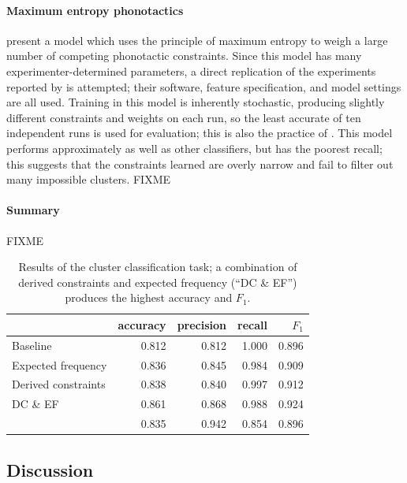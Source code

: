 \paragraph{Maximum entropy phonotactics} \citet{Hayes2008a} present a model which uses the principle of maximum entropy to weigh a large number of competing phonotactic constraints. Since this model has many experimenter-determined parameters, a direct replication of the experiments reported by \citealt{Hayes2008a} is attempted; their software, feature specification, and model settings are all used. Training in this model is inherently stochastic, producing slightly different constraints and weights on each run, so the least accurate of ten independent runs is used for evaluation; this is also the practice of \citeauthor{Hayes2008a}. This model performs approximately as well as other classifiers, but has the poorest recall; this suggests that the constraints learned are overly narrow and fail to filter out many impossible clusters. FIXME

\paragraph{Summary} FIXME

\begin{table} 
\centering
\begin{tabular}{l | rrrr}
\toprule
                    & accuracy & precision & recall & $F_1$ \\
\midrule
Baseline            & 0.812    & 0.812     & 1.000  & 0.896 \\
Expected frequency  & 0.836    & 0.845     & 0.984  & 0.909 \\
Derived constraints & 0.838    & 0.840     & 0.997  & 0.912 \\
DC \& EF            & 0.861    & 0.868     & 0.988  & 0.924 \\
\citet{Hayes2008a}  & 0.835    & 0.942     & 0.854  & 0.896 \\
\bottomrule
\end{tabular}
\caption{Results of the cluster classification task; a combination of derived constraints and expected frequency (``DC \& EF'') produces the highest accuracy and $F_1$.}
\label{cmresults}
\end{table}

\subsection{Discussion}

